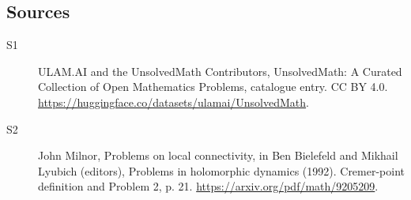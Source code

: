 \documentclass[11pt]{article}
\begin{document}
\subsection{Sources}
\begin{description}
\item[\hypertarget{source:statement:1}{S1}] ULAM.AI and the UnsolvedMath Contributors, UnsolvedMath: A Curated Collection of Open Mathematics Problems, catalogue entry. CC BY 4.0. \url{https://huggingface.co/datasets/ulamai/UnsolvedMath}.
\item[\hypertarget{source:statement:2}{S2}] John Milnor, Problems on local connectivity, in Ben Bielefeld and Mikhail Lyubich (editors), Problems in holomorphic dynamics (1992). Cremer-point definition and Problem 2, p. 21. \url{https://arxiv.org/pdf/math/9205209}.
\end{description}
\label{end:statement}
\end{document}
